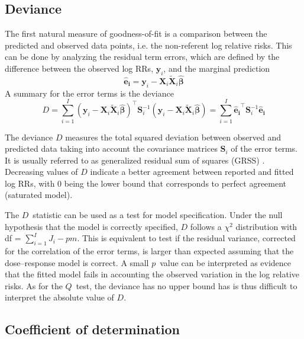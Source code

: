 \documentclass[11pt,a4paper,twoside,openany]{book}\usepackage{knitr}
\begin{document}
{{\subsection{Deviance} 

The first natural measure of goodness-of-fit is a comparison between the predicted and observed data points, i.e. the non-referent log relative risks. This can be done by analyzing the residual term errors, which are defined by the difference between the observed log RRs, $\mathbf{y}_i$, and the marginal prediction
\begin{equation}
\boldsymbol{\hat e_i} = \mathbf{y}_i - \mathbf{X}_i \widetilde{\mathbf{X}}_i \boldsymbol{\hat \beta}
\label{eq:residual}
\end{equation}\noindent A summary for the error terms is the deviance
\begin{equation}
D = \sum_{i=1}^I \left(\mathbf{y}_i - \mathbf{X}_i \widetilde{\mathbf{X}}_i \boldsymbol{\hat \beta} \right)^\top \mathbf{S}_i^{-1} \left(\mathbf{y}_i -\mathbf{X}_i \widetilde{\mathbf{X}}_i \boldsymbol{\hat \beta} \right) = \sum_{i=1}^I \boldsymbol{\hat e_i}^\top \mathbf{S}_i^{-1} \boldsymbol{\hat e_i}
\label{eq:deviance}
\end{equation}

\noindent The deviance $D$ measures the total squared deviation between observed and predicted data taking into account the covariance matrices $\mathbf{S}_i$ of the error terms. It is usually referred to as generalized residual sum of squares (GRSS) \citep{draper2014applied}. Decreasing values of $D$ indicate a better agreement between reported and fitted log RRs, with 0 being the lower bound that corresponds to perfect agreement (saturated model).

\noindent The $D$~statistic can be used as a test for model specification. Under the null hypothesis that the model is correctly specified, $D$ follows a $\chi^2$ distribution with df = $\sum_{i=1}^I J_i - pm$. This is equivalent to test if the residual variance, corrected for the correlation of the error terms, is larger than expected assuming that the dose--response model is correct. A small $p$~value can be interpreted as evidence that the fitted model fails in accounting the observed variation in the log relative risks. As for the $Q$~test, the deviance has no upper bound has is thus difficult to interpret the absolute value of $D$.

\subsection{Coefficient of determination}

}}
\end{document}
